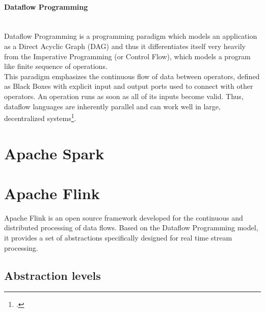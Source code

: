\paragraph{Dataflow Programming}  \label{DataflowProg} ~\\

Dataflow Programming is a programming paradigm which models an application as a Direct Acyclic Graph (DAG) and thus it differentiates itself very heavily from the Imperative Programming (or Control Flow), which models a program like finite sequence of operations.\\
This paradigm emphasizes the continuous flow of data between operators, defined as Black Boxes with explicit input and output ports used to connect with other operators. An operation runs as soon as all of its inputs become valid. Thus, dataflow languages are inherently parallel and can work well in large, decentralized systems\footcite{Johnston:2004:ADP:1013208.1013209}.\\

\pagebreak
\section{Apache Spark} \label{Spark}

\pagebreak
\section{Apache Flink}\label{Flink}

Apache Flink is an open source framework developed for the continuous and distributed processing of data flows. Based on the Dataflow Programming model, it provides a set of abstractions specifically designed for real time stream processing.

\subsection{Abstraction levels}  \label{AbstractionLevels}

